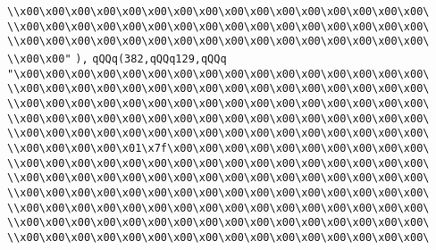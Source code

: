 \verb|\\x00\x00\x00\x00\x00\x00\x00\x00\x00\x00\x00\x00\x00\x00\x00\x00\|\newline
\verb|\\x00\x00\x00\x00\x00\x00\x00\x00\x00\x00\x00\x00\x00\x00\x00\x00\|\newline
\verb|\\x00\x00\x00\x00\x00\x00\x00\x00\x00\x00\x00\x00\x00\x00\x00\x00\|\newline
\verb|\\x00\x00"|\newline
\verb|),|\newline
\verb|qQQq(382,qQQq129,qQQq|\newline
\verb|"\x00\x00\x00\x00\x00\x00\x00\x00\x00\x00\x00\x00\x00\x00\x00\x00\|\newline
\verb|\\x00\x00\x00\x00\x00\x00\x00\x00\x00\x00\x00\x00\x00\x00\x00\x00\|\newline
\verb|\\x00\x00\x00\x00\x00\x00\x00\x00\x00\x00\x00\x00\x00\x00\x00\x00\|\newline
\verb|\\x00\x00\x00\x00\x00\x00\x00\x00\x00\x00\x00\x00\x00\x00\x00\x00\|\newline
\verb|\\x00\x00\x00\x00\x00\x00\x00\x00\x00\x00\x00\x00\x00\x00\x00\x00\|\newline
\verb|\\x00\x00\x00\x00\x01\x7f\x00\x00\x00\x00\x00\x00\x00\x00\x00\x00\|\newline
\verb|\\x00\x00\x00\x00\x00\x00\x00\x00\x00\x00\x00\x00\x00\x00\x00\x00\|\newline
\verb|\\x00\x00\x00\x00\x00\x00\x00\x00\x00\x00\x00\x00\x00\x00\x00\x00\|\newline
\verb|\\x00\x00\x00\x00\x00\x00\x00\x00\x00\x00\x00\x00\x00\x00\x00\x00\|\newline
\verb|\\x00\x00\x00\x00\x00\x00\x00\x00\x00\x00\x00\x00\x00\x00\x00\x00\|\newline
\verb|\\x00\x00\x00\x00\x00\x00\x00\x00\x00\x00\x00\x00\x00\x00\x00\x00\|\newline
\verb|\\x00\x00\x00\x00\x00\x00\x00\x00\x00\x00\x00\x00\x00\x00\x00\x00\|\newline
